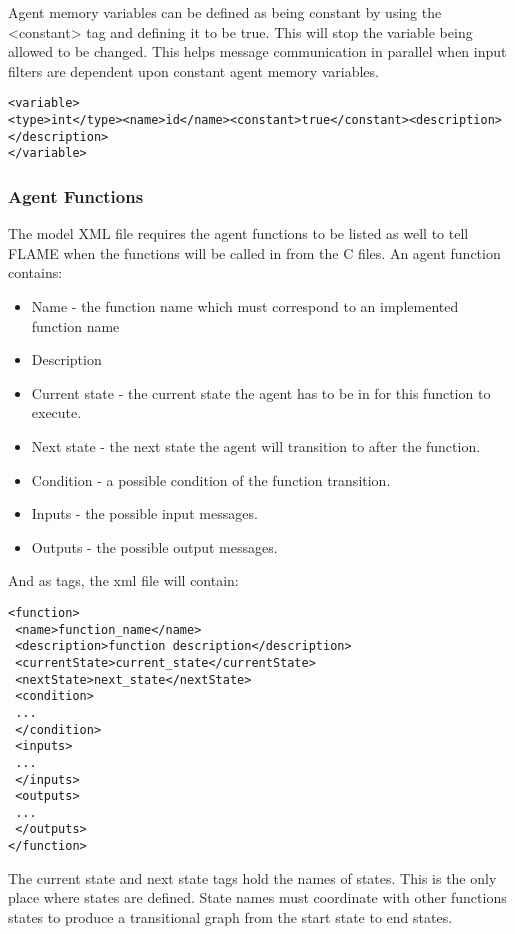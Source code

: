 Agent memory variables can be defined as being constant by using the
<constant> tag and defining it to be true. This will stop the
variable being allowed to be changed. This helps message
communication in parallel when input filters are dependent upon
constant agent memory variables.
\begin{mylisting}
\begin{verbatim}
<variable>
<type>int</type><name>id</name><constant>true</constant><description></description>
</variable>
\end{verbatim}
\end{mylisting}


\subsubsection{Agent Functions}

The model XML file requires the agent functions to be listed as well
to tell FLAME when the functions will be called in from the C files.
An agent function contains:

\begin{itemize}
\item Name - the function name which must correspond to an implemented function
name
\item Description
\item Current state - the current state the agent has to be in for this function to execute.
\item Next state - the next state the agent will transition to after the function.
\item Condition - a possible condition of the function transition.
\item Inputs - the possible input messages.
\item Outputs - the possible output messages.
\end{itemize}

And as tags, the xml file will contain:

\begin{mylisting}
\begin{verbatim}
<function>
 <name>function_name</name>
 <description>function description</description>
 <currentState>current_state</currentState>
 <nextState>next_state</nextState>
 <condition>
 ...
 </condition>
 <inputs>
 ...
 </inputs>
 <outputs>
 ...
 </outputs>
</function>
\end{verbatim}
\end{mylisting}

The current state and next state tags hold the names of states. This is the
only place where states are defined. State names must coordinate with other
functions states to produce a transitional graph from the start state to end
states.

